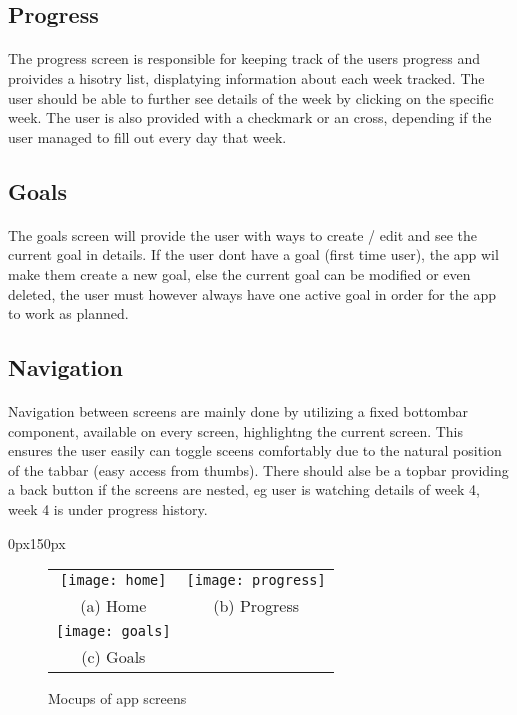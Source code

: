 \documentclass{article}
\begin{document}
    \subsection{Progress}
      \paragraph{}
      The progress screen is responsible for keeping track of the users progress and proivides a hisotry list, displatying
      information about each week tracked. The user should be able to further see details of the week by clicking on the specific week.
      The user is also provided with a checkmark or an cross, depending if the user managed to fill out every day that week.
     
      \hfill \break

    \subsection{Goals}
      \paragraph{}
      The goals screen will provide the user with ways to create / edit and see the current goal in details. 
      If the user dont have a goal (first time user), the app wil make them create a new goal, else the current goal can be modified
      or even deleted, the user must however always have one active goal in order for the app to work as planned.
      
      \hfill \break

    \subsection{Navigation}
      \paragraph{}
      Navigation between screens are mainly done by utilizing a fixed bottombar component, available on every screen, highlightng the current
      screen. This ensures the user easily can toggle sceens comfortably due to the natural position of the tabbar (easy access from thumbs). 
      There should alse be a topbar providing a back button if the screens are nested, eg user is watching details of week 4, week 4 is under progress history.

  \begin{adjustwidth}{0px}{150px}
    \begin{figure}
      \begin{tabular}{cc}
        \texttt{[image: home]} & \texttt{[image: progress]} \\
      (a) Home & (b) Progress \\[25pt]
      \texttt{[image: goals]}\\
      (c) Goals \\[25pt]
      \end{tabular}
      \caption{Mocups of app screens}
    \end{figure}
  \end{adjustwidth}


      
\end{document}

